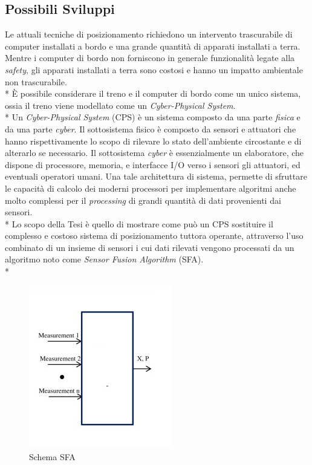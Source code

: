 \subsection{Possibili Sviluppi}
Le attuali tecniche di posizionamento richiedono un intervento trascurabile di computer installati a bordo e una grande quantit\`a di apparati installati a terra. Mentre i computer di bordo non forniscono in generale funzionalit\`a legate alla \emph{safety}, gli apparati installati a terra sono costosi e hanno un impatto ambientale non trascurabile.\\*
\`E possibile considerare il treno e il computer di bordo come un unico sistema, ossia il treno viene modellato come un \emph{Cyber-Physical System}.\\*
Un \emph{Cyber-Physical System} (CPS) \`e un sistema composto da una parte \emph{fisica} e da una parte \emph{cyber}. Il sottosistema fisico \`e composto da sensori e attuatori che hanno rispettivamente lo scopo di rilevare lo stato dell'ambiente circostante e di alterarlo se necessario. Il sottosistema \emph{cyber} \`e essenzialmente un elaboratore, che dispone di processore, memoria, e interfacce I/O verso i sensori gli attuatori, ed eventuali operatori  umani. Una tale architettura di sistema, permette di sfruttare le capacit\`a di calcolo dei moderni processori per implementare algoritmi anche molto complessi per il \emph{processing} di grandi quantit\`a di dati provenienti dai sensori.\\*
Lo scopo della Tesi \`e quello di mostrare come pu\`o un CPS sostituire il complesso e costoso sistema di posizionamento tuttora operante, attraverso l'uso combinato di un insieme di sensori i cui dati rilevati vengono processati da un algoritmo noto come \emph{Sensor Fusion Algorithm} (SFA).\\*
\begin{figure}[h]
	\centering
	\includegraphics{img/sfaschema}
	\caption{Schema SFA}
	\label{fig:sfa}
\end{figure}

